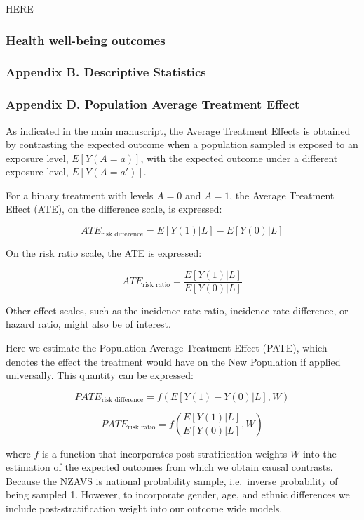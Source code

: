 \documentclass[
  singlecolumn]{article}
\begin{document}
HERE

\subsubsection{Health well-being
outcomes}\label{health-well-being-outcomes}

\subsubsection{Appendix B. Descriptive
Statistics}\label{appendix-b.-descriptive-statistics}

\subsubsection{Appendix D. Population Average Treatment
Effect}\label{appendix-d.-population-average-treatment-effect}

As indicated in the main manuscript, the Average Treatment Effects is
obtained by contrasting the expected outcome when a population sampled
is exposed to an exposure level, \(E[Y(A = a)]\), with the expected
outcome under a different exposure level, \(E[Y(A=a')]\).

For a binary treatment with levels \(A=0\) and \(A=1\), the Average
Treatment Effect (ATE), on the difference scale, is expressed:

\[ATE_{\text{risk difference}} = E[Y(1)|L] - E[Y(0)|L]\]

On the risk ratio scale, the ATE is expressed:

\[ATE_{\text{risk ratio}} = \frac{E[Y(1)|L]}{E[Y(0)|L]}\]

Other effect scales, such as the incidence rate ratio, incidence rate
difference, or hazard ratio, might also be of interest.

Here we estimate the Population Average Treatment Effect (PATE), which
denotes the effect the treatment would have on the New Population if
applied universally. This quantity can be expressed:

\[PATE_{\text{risk difference}} = f(E[Y(1) - Y(0)|L], W)\]

\[PATE_{\text{risk ratio}} = f\left(\frac{E[Y(1)|L]}{E[Y(0)|L]}, W\right)\]

where \(f\) is a function that incorporates post-stratification weights
\(W\) into the estimation of the expected outcomes from which we obtain
causal contrasts. Because the NZAVS is national probability sample,
i.e.~inverse probability of being sampled 1. However, to incorporate
gender, age, and ethnic differences we include post-stratification
weight into our outcome wide models.
\end{document}
